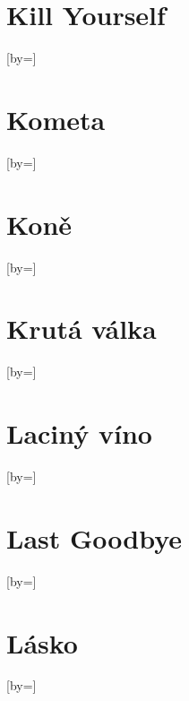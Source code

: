 \documentclass{article}
\begin{document}
\begin{songs}{}
\section{Kill Yourself}
\begin{song}{}[by={}]
\beginverse

\endverse
\end{song}

\section{Kometa}
\begin{song}{}[by={}]
\beginverse

\endverse
\end{song}

\section{Koně}
\begin{song}{}[by={}]
\beginverse

\endverse
\end{song}

\section{Krutá válka}
\begin{song}{}[by={}]
\beginverse

\endverse
\end{song}

\section{Laciný víno}
\begin{song}{}[by={}]
\beginverse

\endverse
\end{song}

\section{Last Goodbye}
\begin{song}{}[by={}]
\beginverse

\endverse
\end{song}

\section{Lásko}
\begin{song}{}[by={}]
\beginverse


\end{song}
\end{songs}
\end{document}
